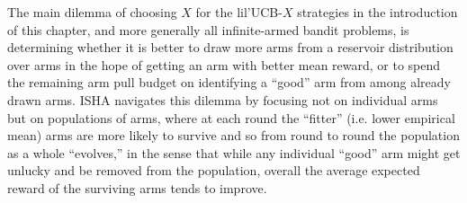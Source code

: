 The main dilemma of choosing $X$ for the lil'UCB-$X$ strategies in the introduction of this chapter, and more generally all infinite-armed bandit problems, is determining whether it is better to draw more arms from a reservoir distribution over arms in the hope of getting an arm with better mean reward, or to spend the remaining arm pull budget on identifying a ``good'' arm from among already drawn arms.
ISHA navigates this dilemma by focusing not on individual arms but on populations of arms, where at each round the ``fitter'' (i.e. lower empirical mean) arms are more likely to survive and so from round to round the population as a whole ``evolves,'' in the sense that while any individual ``good'' arm might get unlucky and be removed from the population, overall the average expected reward of the surviving arms tends to improve.









